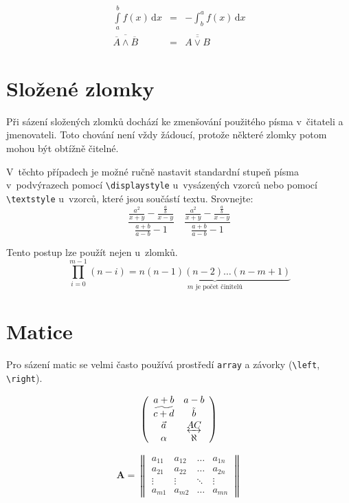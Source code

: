 \documentclass[11pt,a4paper,twocolumn]{article}
\begin{document}
\begin{eqnarray}
\int\limits_a^b f(x)\, \mathrm{d}x &=& -\int_b^a f(x)\, \mathrm{d}x  \\
\overline{\overline{A} \wedge \overline{B}} &=& \overline{\overline{A \vee B}}
\end{eqnarray}

\section{Složené zlomky}
Při sázení složených zlomků dochází ke zmenšování použitého písma v~čitateli a jmenovateli. Toto chování není vždy žádoucí, protože některé zlomky potom mohou být obtížně čitelné. 

V~těchto případech je možné ručně nastavit standardní stupeň písma v~podvýrazech pomocí \verb|\displaystyle| u~vysázených vzorců nebo pomocí \verb|\textstyle| u~vzorců, které jsou součástí textu. Srovnejte:
$$\frac{\frac{a^2}{x+y}-\frac{\frac{a}{b}}{x-y}} {\frac{a+b}{a-b} - 1} \quad \frac{\displaystyle \frac{\displaystyle a^2}{\displaystyle x+y}-\frac{\displaystyle \frac{\displaystyle a}{\displaystyle b}}{\displaystyle x-y}} {\displaystyle \frac{\displaystyle a+b}{\displaystyle a-b} - 1}
$$

Tento postup lze použít nejen u~zlomků.
$$\prod\limits^{m-1}_{i=0} (n-i) = \underbrace{n(n-1)(n-2)\dots(n-m+1)}_
{\displaystyle m \mbox{ je počet činitelů}} $$
\section{Matice}

Pro sázení matic se velmi často používá prostředí \texttt{array} a závorky  (\verb|\left|, \verb|\right|). 

$$\left( \begin{array}{cc}
a + b & a - b \\
\widetilde{c + d} & \tilde{b} \\
\vec{a} & \underleftrightarrow{AC} \\
\alpha & \aleph\\
\end{array} \right)$$

$$\mathbf{A}=\left\|\begin{array}{cccc}
a_{11} & a_{12} & \ldots & a_{1n} \\
a_{21} & a_{22} & \ldots & a_{2n} \\
\vdots & \vdots & \ddots & \vdots \\
a_{m1} & a_{m2} & \ldots & a_{mn}
\end{array}\right\|$$
\end{document}

